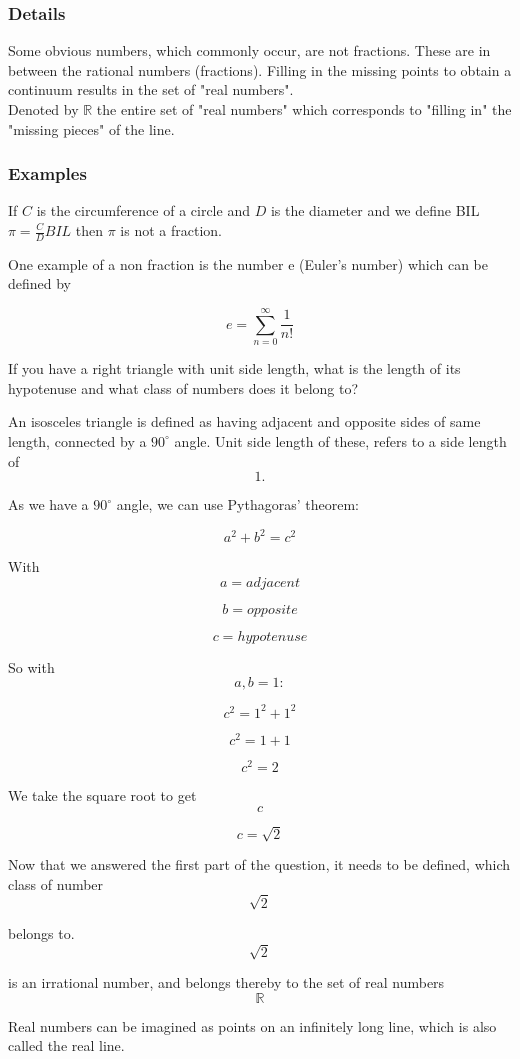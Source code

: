 \documentclass[12pt,a4paper]{article}
\theoremstyle{regla}
\theoremstyle{remark}
\theoremstyle{definition}
\theoremstyle{nonumberbreak}
\begin{document}
\subsubsection{Details}
Some obvious numbers, which commonly occur, are not fractions. These are in between the rational numbers (fractions).  Filling in the missing points to obtain a continuum results in the set of "real numbers".\\

Denoted by $\mathbb{R}$ the entire set of "real numbers"  which corresponds to "filling in"  the "missing pieces"  of the line. 

\subsubsection{Examples}

\begin{xmpl}
If $C$ is the circumference of a circle and $D$ is the diameter and we define BIL$\pi=\frac{C}{D}BIL$ then $\pi$ is not a fraction.
\end{xmpl}


\begin{xmpl}
One example of a non fraction is the number e (Euler's number) which can be defined by   

$$e = \sum_{n=0}^{\infty }\frac{1}{n!}$$
\end{xmpl}
\begin{xmpl}

If you have a right triangle with unit side length, what is the length of its hypotenuse and what class of numbers does it belong to?

An isosceles triangle is defined as having adjacent and opposite sides of same length, connected by a 
$90^{\circ}$ angle.
Unit side length of these, refers to a side length of $$1.$$
 
As we have a $90^{\circ}$ angle, we can use Pythagoras' theorem:

$$a^2+b^2=c^2$$

With
$$a=adjacent$$

$$b=opposite$$

$$c=hypotenuse$$

So with $$a,b=1:$$

$$c^2=1^2+1^2$$

$$c^2=1+1$$

$$c^2=2$$

We take the square root to get $$c$$

$$c=\sqrt{2}$$

Now that we answered the first part of the question, it needs to be defined, which class of number $$\sqrt{2}$$

belongs to. $$\sqrt{2}$$

is an irrational number, and belongs thereby to the set of real numbers $$\mathbb{R}$$

Real numbers can be imagined as points on an infinitely long line, which is also called the real line.
\end{xmpl}
\end{document}
